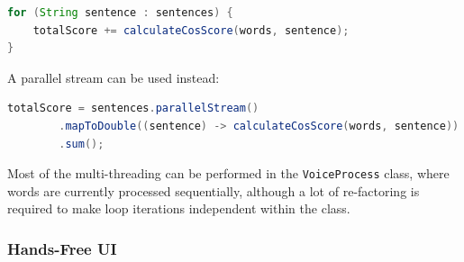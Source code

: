 \documentclass[11pt]{article}
\begin{document}
\begin{lstlisting}[language=Java, label=lst:loop-seq]
for (String sentence : sentences) {
    totalScore += calculateCosScore(words, sentence);
}
\end{lstlisting}

A parallel stream can be used instead:

\begin{lstlisting}[language=Java, label=lst:loop-stream]
totalScore = sentences.parallelStream()
        .mapToDouble((sentence) -> calculateCosScore(words, sentence))
        .sum();
\end{lstlisting}

Most of the multi-threading can be performed in the \texttt{VoiceProcess} class, where words are currently processed sequentially, although a lot of re-factoring is required to make loop iterations independent within the class.

\subsubsection{Hands-Free UI}
\end{document}

